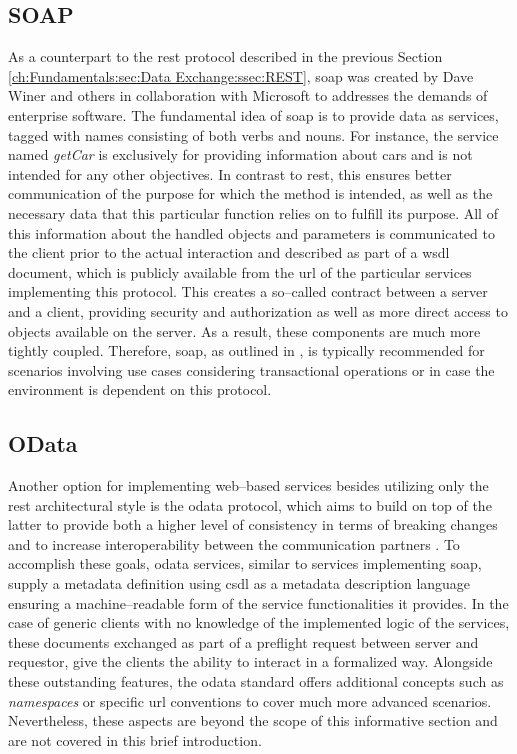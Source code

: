 \subsection{SOAP}
\label{ch:Fundamentals:sec:Data Exchange:ssec:SOAP}

As a counterpart to the \acrshort{rest} protocol described in the previous Section \ref{ch:Fundamentals:sec:Data Exchange:ssec:REST}, \acrshort{soap} was created by Dave Winer and others in collaboration with Microsoft \cite{patni_pro_2017} to addresses the demands of enterprise software.
The fundamental idea of \acrshort{soap} is to provide data as services, tagged with names consisting of both verbs and nouns. For instance, the service named \textit{getCar} is exclusively for providing information about cars and is not intended for any other objectives.
In contrast to \acrshort{rest}, this ensures better communication of the purpose for which the method is intended, as well as the necessary data that this particular function relies on to fulfill its purpose. All of this information about the handled objects and parameters is communicated to the client prior to the actual interaction and described as part of a \acrfull{wsdl} document, which is publicly available from the \acrshort{url} of the particular services implementing this protocol.
This creates a so--called contract between a server and a client, providing security and authorization as well as more direct access to objects available on the server. As a result, these components are much more tightly coupled.
Therefore, \acrshort{soap}, as outlined in \cite[4]{patni_pro_2017}, is typically recommended for scenarios involving use cases considering transactional operations or in case the environment is dependent on this protocol.

\subsection{OData}
\label{ch:Fundamentals:sec:Data Exchange:ssec:OData}

Another option for implementing web--based services besides utilizing only the \acrshort{rest} architectural style is the \acrshort{odata} protocol, which aims to build on top of the latter to provide both a higher level of consistency in terms of breaking changes and to increase interoperability between the communication partners \cite{noauthor_documentation_nodate}.
To accomplish these goals, \acrshort{odata} services, similar to services implementing \acrshort{soap}, supply a metadata definition using \acrfull{csdl} as a metadata description language ensuring a machine--readable form of the service functionalities it provides.
In the case of generic clients with no knowledge of the implemented logic of the services, these documents exchanged as part of a preflight request between server and requestor, give the clients the ability to interact in a formalized way.
Alongside these outstanding features, the \acrshort{odata} standard offers additional concepts such as \textit{namespaces} or specific \acrshort{url} conventions to cover much more advanced scenarios.
Nevertheless, these aspects are beyond the scope of this informative section and are not covered in this brief introduction.

